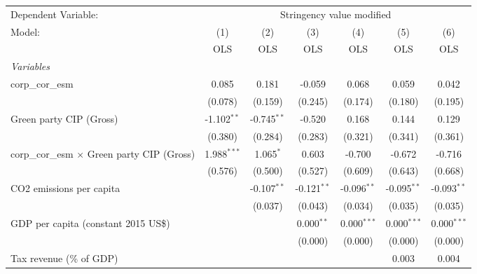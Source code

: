 
\begingroup
\centering
\begin{tabular}{lcccccc}
   \toprule
   Dependent Variable: & \multicolumn{6}{c}{Stringency value modified}\\
   Model:                                             & (1)           & (2)           & (3)           & (4)           & (5)           & (6)\\  
                                                      &  OLS          & OLS           & OLS           & OLS           & OLS           & OLS\\  
   \midrule
   \emph{Variables}\\
   corp\_cor\_esm                                     & 0.085         & 0.181         & -0.059        & 0.068         & 0.059         & 0.042\\   
                                                      & (0.078)       & (0.159)       & (0.245)       & (0.174)       & (0.180)       & (0.195)\\   
   Green party CIP (Gross)                            & -1.102$^{**}$ & -0.745$^{**}$ & -0.520        & 0.168         & 0.144         & 0.129\\   
                                                      & (0.380)       & (0.284)       & (0.283)       & (0.321)       & (0.341)       & (0.361)\\   
   corp\_cor\_esm $\times$ Green party CIP (Gross)    & 1.988$^{***}$ & 1.065$^{*}$   & 0.603         & -0.700        & -0.672        & -0.716\\   
                                                      & (0.576)       & (0.500)       & (0.527)       & (0.609)       & (0.643)       & (0.668)\\   
   CO2 emissions per capita                           &               & -0.107$^{**}$ & -0.121$^{**}$ & -0.096$^{**}$ & -0.095$^{**}$ & -0.093$^{**}$\\   
                                                      &               & (0.037)       & (0.043)       & (0.034)       & (0.035)       & (0.035)\\   
   GDP per capita (constant 2015 US\$)                &               &               & 0.000$^{**}$  & 0.000$^{***}$ & 0.000$^{***}$ & 0.000$^{***}$\\   
                                                      &               &               & (0.000)       & (0.000)       & (0.000)       & (0.000)\\   
   Tax revenue (\% of GDP)                            &               &               &               &               & 0.003         & 0.004\\   

\end{tabular}
